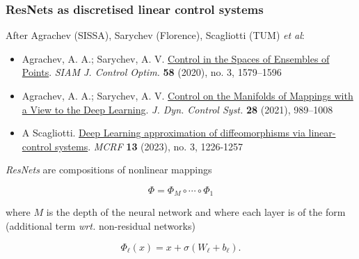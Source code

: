 \documentclass[9pt]{beamer}
\begin{document}
\begin{frame}
\frametitle{\bf ResNets as discretised linear control systems}

After Agrachev (SISSA), Sarychev (Florence), Scagliotti (TUM) \emph{et al}:

\begin{itemize}
\item
  Agrachev, A. A.; Sarychev, A. V.
  \href{https://epubs.siam.org/doi/10.1137/19M1273049}{Control in the
  Spaces of Ensembles of Points}. \emph{SIAM J. Control Optim.}
  \textbf{58} (2020), no. 3, 1579--1596
\item
  Agrachev, A. A.; Sarychev, A. V.
  \href{https://link.springer.com/article/10.1007/s10883-021-09561-2}{Control
  on the Manifolds of Mappings with a View to the Deep Learning}.
  \emph{J. Dyn. Control Syst.} \textbf{28} (2021), 989--1008
\item
  A Scagliotti.
  \href{https://www.aimsciences.org/article/doi/10.3934/mcrf.2022036}{Deep
  Learning approximation of diffeomorphisms via linear-control systems}.
  \emph{MCRF} \textbf{13} (2023), no. 3, 1226-1257
\end{itemize}

\emph{ResNets} are compositions of nonlinear mappings

\[ \Phi = \Phi_M \circ \cdots \circ \Phi_1 \]

where $M$ is the depth of the neural network
and where each layer is of the form (additional term
\emph{wrt.} non-residual networks)

\[ \Phi_\ell(x) = x + \sigma(W_\ell+b_\ell). \]

\end{frame}
\end{document}
